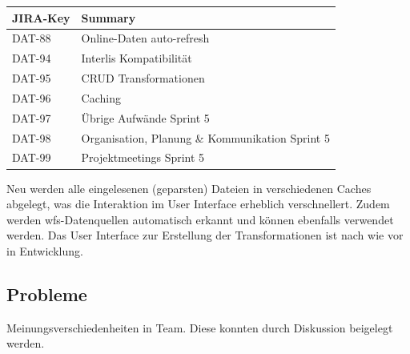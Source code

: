 \begin{table}[H]
\centering
\begin{tabular}{ll}
	\toprule
	\textbf{JIRA-Key} & \textbf{Summary}\\
	\midrule
DAT-88 & Online-Daten auto-refresh\\
DAT-94 & Interlis Kompatibilität\\
DAT-95 & CRUD Transformationen\\
DAT-96 & Caching\\
DAT-97 & Übrige Aufwände Sprint 5\\
DAT-98 & Organisation, Planung \& Kommunikation Sprint 5\\
DAT-99 & Projektmeetings Sprint 5\\
	\bottomrule
\end{tabular}	
\end{table}

Neu werden alle eingelesenen (geparsten) Dateien in verschiedenen Caches abgelegt, was die Interaktion im User Interface erheblich verschnellert. Zudem werden \acs{wfs}-Datenquellen automatisch erkannt und können ebenfalls verwendet werden. Das User Interface zur Erstellung der Transformationen ist nach wie vor in Entwicklung.

\subsection*{Probleme}
Meinungsverschiedenheiten in Team. Diese konnten durch Diskussion beigelegt werden.
